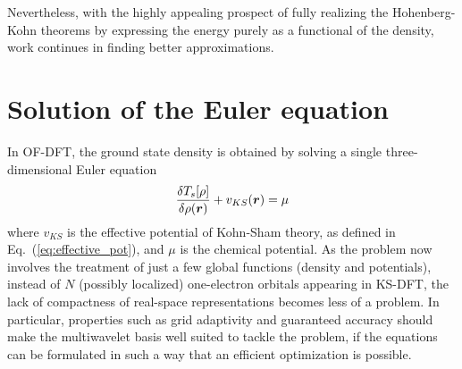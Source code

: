 Nevertheless, with the highly appealing prospect of fully realizing the Hohenberg-Kohn theorems by expressing
the energy purely as a functional of the density, work continues in finding better approximations. 

\section{Solution of the Euler equation}
In OF-DFT, the ground state density is obtained by solving a single three-dimensional Euler equation
\begin{equation}
    \label{eq:OF-Euler}
    \frac{\delta T_s[\rho]}{\delta \rho(\boldsymbol r)} + v_{KS}(\boldsymbol r) = \mu
\end{equation}
where $v_{KS}$ is the effective potential of Kohn-Sham theory, as defined in Eq.~(\ref{eq:effective_pot}), and $\mu$ 
is the chemical potential. As the problem now involves the treatment of just a few global functions (density 
and potentials), instead of $N$ (possibly localized) one-electron orbitals appearing in KS-DFT, the lack of 
compactness of real-space representations becomes less of a problem\cite{Cervera:2006,Gavini:2006}. 
In particular, properties such as grid 
adaptivity and guaranteed accuracy should make the multiwavelet basis well suited to tackle the problem, if 
the equations can be formulated in such a way that an efficient optimization is possible. 

